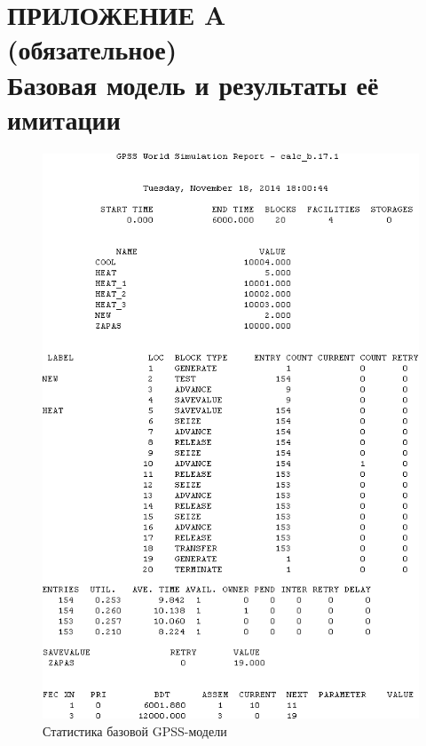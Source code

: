 \renewcommand{\thefigure}{\Asbuk{section}.\arabic{figure}}
\renewcommand{\thetable}{\Asbuk{section}.\arabic{table}}
\renewcommand{\thelstlisting}{\Asbuk{section}.\arabic{lstlisting}}

\section*{ПРИЛОЖЕНИЕ A \\ 
  (обязательное) \\ 
  Базовая модель и результаты её имитации}
\label{sec:appendix_a}

\pagestyle{fancy}
\fancyhf{}  %
\fancyfoot[R]{\thepage}
\renewcommand{\headrulewidth}{0pt}
\renewcommand{\footrulewidth}{0pt}

\setlength{\headheight}{10mm}
\setlength{\headsep}{\baselineskip}

\thispagestyle{plain}

\setcounter{section}{1}
\setcounter{figure}{0}
\setcounter{table}{0}
\setcounter{lstlisting}{0}



\begin{figure}[h!]
  \centering
  \includegraphics[width=150mm]{pic/base_report}
  \caption{Статистика базовой GPSS-модели}
  \label{pic:base_report}
\end{figure}
